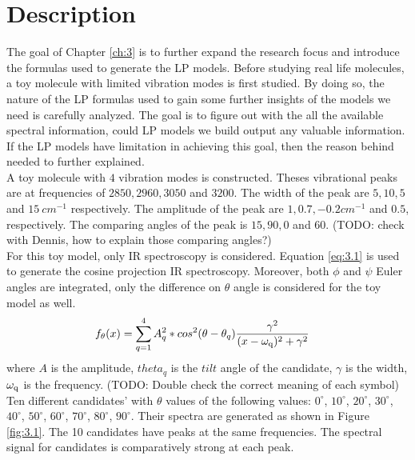  \label{ch:3}

\section{Description}
The goal of Chapter \ref{ch:3} is to further expand the research focus and introduce the formulas used to generate the LP models. Before studying real life molecules, a toy molecule with limited vibration modes is first studied. By doing so, the nature of the LP formulas used to gain some further insights of the models we need is carefully analyzed. The goal is to figure out with the all the available spectral information, could LP models we build output any valuable information. If the LP models have limitation in achieving this goal, then the reason behind needed to further explained. \\

A toy molecule with $4$ vibration modes is constructed. Theses vibrational peaks are at frequencies of $2850, 2960, 3050$ and $3200$. The width of the peak are $5, 10, 5$ and $15~cm^{-1}$ respectively. The amplitude of the peak are $1, 0.7, -0.2cm^{-1}$ and $0.5$, respectively. The comparing angles of the peak is $15, 90, 0$ and $60$. (TODO: check with Dennis, how to explain those comparing angles?)  \\

For this toy model, only IR spectroscopy is considered. Equation \ref{eq:3.1} is used to generate the cosine projection IR spectroscopy. Moreover, both $\phi$ and $\psi$ Euler angles are integrated, only the difference on $\theta$ angle is considered for the toy model as well. \\

\begin{eqnarray} \label{eq:3.1}
& f_{\theta}(x) = \displaystyle\sum^{4}_{q=1} A_q^2 * cos^2(\theta - \theta_q)\frac{\gamma^2}{(x- \omega_{\rm q})^2 + \gamma^2} 
\end{eqnarray}
where $A$ is the amplitude, $theta_{q}$ is the $tilt$ angle of the candidate, $\gamma$ is the width, $\omega_{\rm q}$ is the frequency. (TODO: Double check the correct meaning of each symbol) Ten different candidates' with $\theta$ values of the following values: $0^{\circ}$, $10^{\circ}$, $20^{\circ}$, $30^{\circ}$, $40^{\circ}$, $50^{\circ}$, $60^{\circ}$, $70^{\circ}$, $80^{\circ}$, $90^{\circ}$. Their spectra are generated as shown in Figure \ref{fig:3.1}. The 10 candidates have peaks at the same frequencies. The spectral signal for candidates is comparatively strong at each peak. \\

